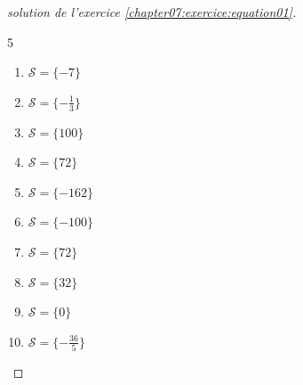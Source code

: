 \documentclass[main.tex]{subfiles}
\begin{document}
\begin{proof}[solution de l'exercice \ref{chapter07:exercice:equation01}]\hfill
	\begin{multicols}{5}
		\begin{enumerate}[label={$(E_{\arabic*}$)}, leftmargin=*]
			\item $\mathcal{S}=\{-7\}$
			\item $\mathcal{S}=\{-\frac{1}{3}\}$ 
			\item $\mathcal{S}=\{100\}$ 
			\item   $\mathcal{S}=\{72\}$ 
			\item $\mathcal{S}=\{-162\}$  
			\item $\mathcal{S}=\{-100\}$  
			\item $\mathcal{S}=\{72\}$  
			\item $\mathcal{S}=\{32\}$  
			\item $\mathcal{S}=\{0\}$  
			\item $\mathcal{S}=\{-\frac{36}{5}\}$  
		\end{enumerate}
	\end{multicols} \scriptsize	
\end{proof}
\end{document}
